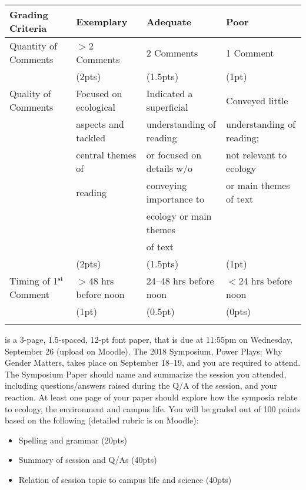 \documentclass{tufte-handout}
\begin{document}
\begin{fullwidth}
\begin{tabular}{l l l l}
\\
\hline
\textbf{Grading Criteria} & \textbf{Exemplary} & \textbf{Adequate} & \textbf{Poor} \\
\hline
Quantity of Comments & $>$2 Comments & 2 Comments & 1 Comment \\
& (2pts) & (1.5pts) & (1pt) \\
\hline
Quality of Comments & Focused on ecological & Indicated a superficial & Conveyed little \\
& aspects and tackled & understanding of reading & understanding of reading; \\
& central themes of & or focused on details w/o& not relevant to ecology \\
& reading &  conveying importance to & or main themes of text \\
& & ecology or main themes & \\
& & of text & \\
& (2pts) & (1.5pts) & (1pt) \\
\hline
Timing of 1$^\mathrm{st}$ Comment & $>$48 hrs before noon & 24--48 hrs before noon & $<$24 hrs before noon \\
& (1pt) & (0.5pt) & (0pts) \\
\hline \\
\end{tabular}

 is a 3-page, 1.5-spaced, 12-pt font paper, that is due at 
11:55pm on Wednesday, September 26 (upload on Moodle). 											%
The 2018 Symposium, Power Plays: Why Gender Matters, %
takes place on September 18--19, 													 %
and you are required to attend. The Symposium Paper should name and summarize the session you attended, including questions/answers raised during the Q/A of the session, and your reaction. At least one page of your paper should explore how the symposia relate to ecology, the environment and campus life. You will be graded out of 100 points based on the following (detailed rubric is on Moodle): 

\begin{itemize}
\item Spelling and grammar (20pts)
\item Summary of session and Q/As (40pts)
\item Relation of session topic to campus life and science (40pts)
\end{itemize}


\end{fullwidth}
\end{document}
